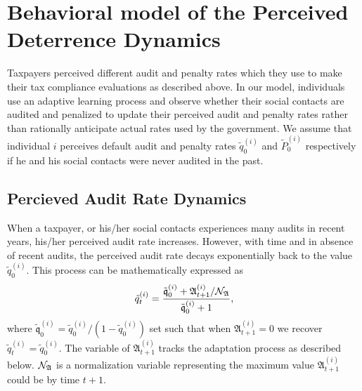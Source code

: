 \documentclass{NSF_proposal_mod}
\begin{document}
\section{Behavioral model of the Perceived Deterrence Dynamics}
\label{Sec:Deterrance}

Taxpayers perceived different audit and penalty rates which they use to make their tax compliance evaluations as described above. In our model, individuals use an adaptive learning process and observe whether their social contacts are audited and penalized to update their perceived audit and penalty rates rather than rationally anticipate actual rates used by the government.  We assume that individual $i$ perceives default audit and penalty rates $\tilde{q}^{(i)}_0$ and $\tilde{P}^{(i)}_0$ respectively if he and his social contacts were never audited in the past. 


\subsection{Percieved Audit Rate Dynamics}
When a taxpayer, or his/her social contacts experiences many audits in recent years, his/her perceived audit rate increases. However, with time and in absence of recent audits, the perceived audit rate decays exponentially back to the value $\tilde{q}^{(i)}_0$. This process can be mathematically expressed as 
\begin{equation}
\tilde{q}^{(i)}_t = \frac{\tilde{\mathfrak q}^{(i)}_0+ {\mathfrak A}_{t+1}^{(i)}/ {\cal N}_{\mathfrak A}}{\tilde{\mathfrak q}^{(i)}_0+1},
\end{equation}
where $\tilde{\mathfrak q}^{(i)}_0= \tilde{q}^{(i)}_0/(1-\tilde{q}^{(i)}_0)$ set such that when ${\mathfrak A}_{t+1}^{(i)}=0$ we recover $\tilde{q}^{(i)}_t = \tilde{q}^{(i)}_0$. The variable of ${\mathfrak A}_{t+1}^{(i)}$ tracks the adaptation process as described below. ${\cal N}_{\mathfrak A}$ is a normalization variable representing the maximum value ${\mathfrak A}_{t+1}^{(i)}$ could be by time $t+1$. 
\end{document}
